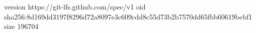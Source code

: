version https://git-lfs.github.com/spec/v1
oid sha256:8d169dd3197f8296d72a8097e3c609cdd8c55d73b2b7570dd65fbb60619bebf1
size 196704
